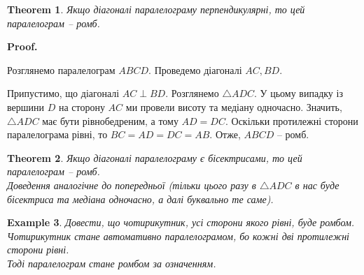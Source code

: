 \documentclass[a4paper, 10pt]{article}
\makeatletter
\theoremstyle{theoremdd}
\newtheorem{theorem}{Theorem}[subsection]
\theoremstyle{theoremdd}
\theoremstyle{theoremdd}
\theoremstyle{theoremdd}
\theoremstyle{theoremdd}
\newtheorem{example}[theorem]{Example}
\theoremstyle{theoremdd}
\theoremstyle{theoremdd}
\theoremstyle{theoremdd}
\theoremstyle{theoremdd}
\renewenvironment{proof}[1][Proof.\\]{\par
\pushQED{\hfill \qed}%
\normalfont \topsep6\p@\@plus6\p@\relax
\trivlist
\item\relax
{\bfseries
#1\@addpunct{.}}\hspace\labelsep\ignorespaces
}{%
\popQED\endtrivlist\@endpefalse
}
\makeatother
\begin{document}
\begin{theorem}
Якщо діагоналі паралелограму перпендикулярні, то цей паралелограм -- ромб.
\end{theorem}

\begin{proof}
Розглянемо паралелограм $ABCD$. Проведемо діагоналі $AC,BD$.
\begin{figure}[H]
\centering
{}
\end{figure}
Припустимо, що діагоналі $AC \perp BD$. Розглянемо $\triangle ADC$. У цьому випадку із вершини $D$ на сторону $AC$ ми провели висоту та медіану одночасно. Значить, $\triangle ADC$ має бути рівнобедреним, а тому $AD = DC$. Оскільки протилежні сторони паралелограма рівні, то $BC = AD = DC = AB$. Отже, $ABCD$ -- ромб.
\end{proof}

\begin{theorem}
Якщо діагоналі паралелограму є бісектрисами, то цей паралелограм -- ромб.\\
\textit{Доведення аналогічне до попередньої (тільки цього разу в $\triangle ADC$ в нас буде бісектриса та медіана одночасно, а далі буквально те саме).}
\end{theorem}

\begin{example}
Довести, що чотирикутник, усі сторони якого рівні, буде ромбом.\\
Чотирикутник стане автомативно паралелограмом, бо кожні дві протилежні сторони рівні.\\
Тоді паралелограм стане ромбом за означенням.
\end{example}
\end{document}
